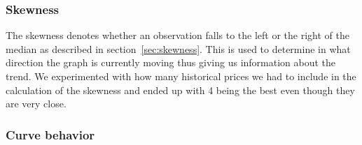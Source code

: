 \subsubsection{Skewness}
\begin{table}[H]
\centering  %
\caption{Number of historical prices to include in the skewness calculation} %
\label{table:SkewnessTest} %
\end{table}

The skewness denotes whether an observation falls to the left or the right of the median as described in section~\ref{sec:skewness}. This is used to determine in what direction the graph is currently moving thus giving us information about the trend. We experimented with how many historical prices we had to include in the calculation of the skewness and ended up with 4 being the best even though they are very close.

\subsubsection{Curve behavior}
\begin{table}[H]
\centering  %
\caption{Curve behavior stack size} %
\label{table:CurveTest} %
\end{table}

